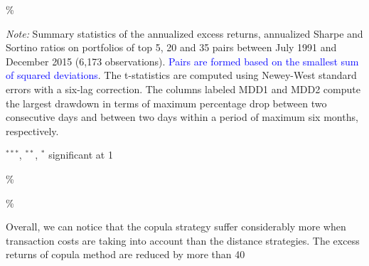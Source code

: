 \documentclass[a4paper]{article}
\begin{document}
\begin{threeparttable}[H]
\begin{tabularx}{\textwidth}{@{\extracolsep{\fill}}llllllll@{}}
			\bottomrule
		\end{tabularx}\%
		\begin{tablenotes}
			\item \textit{Note:} \tiny Summary statistics of the annualized excess returns, annualized Sharpe and Sortino ratios on portfolios of top 5, 20 and 35 pairs between July 1991 and December 2015 (6,173 observations).  \textcolor{blue} {Pairs are formed based on the smallest sum of squared deviations}. The t-statistics are computed using Newey-West standard errors with a six-lag correction. The columns labeled MDD1 and MDD2 compute the largest drawdown in terms of maximum percentage drop between two consecutive days and between two days within a period of maximum six months, respectively.
			\item \scriptsize $^{\ast\ast\ast}$, $^{\ast\ast}$, $^{\ast}$  significant at 1\\%
		\end{tablenotes}
		\label{tab:table103}\%
	\end{threeparttable}\%
	
	\vspace{0.3cm}
	
	Overall, we can notice that the copula strategy suffer considerably more when transaction costs are taking into account than the distance strategies. The excess returns of copula method are reduced by more than 40\\%
	

	\vspace{0.3cm}
	
\end{document}
